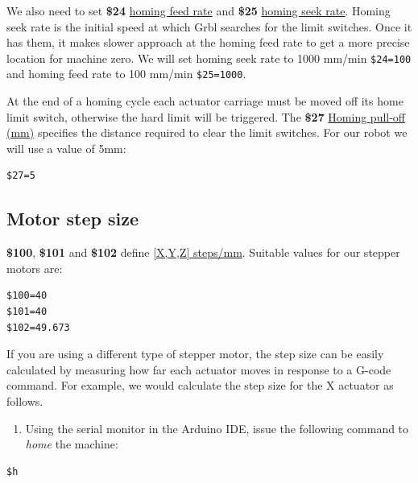 \documentclass[
]{book}
\providecommand{\tightlist}{%
  \setlength{\itemsep}{0pt}\setlength{\parskip}{0pt}}
\begin{document}
We also need to set \textbf{\$24} \href{https://github.com/gnea/grbl/wiki/Grbl-v1.1-Configuration\#24---homing-feed-mmmin}{homing feed rate} and \textbf{\$25} \href{https://github.com/gnea/grbl/wiki/Grbl-v1.1-Configuration\#25---homing-seek-mmmin}{homing seek rate}. Homing seek rate is the initial speed at which Grbl searches for the limit switches. Once it has them, it makes slower approach at the homing feed rate to get a more precise location for machine zero. We will set homing seek rate to 1000 mm/min \texttt{\$24=100} and homing feed rate to 100 mm/min \texttt{\$25=1000}.

At the end of a homing cycle each actuator carriage must be moved off its home limit switch, otherwise the hard limit will be triggered.
The \textbf{\$27} \href{https://github.com/gnea/grbl/wiki/Grbl-v1.1-Configuration\#27---homing-pull-off-mm}{Homing pull-off (mm)} specifies the distance required to clear the limit switches. For our robot we will use a value of 5mm:

\begin{verbatim}
$27=5
\end{verbatim}

\hypertarget{motor-step-size}{%
\subsection{Motor step size}\label{motor-step-size}}

\textbf{\$100}, \textbf{\$101} and \textbf{\$102} define \href{https://github.com/gnea/grbl/wiki/Grbl-v1.1-Configuration\#100-101-and-102--xyz-stepsmm}{{[}X,Y,Z{]} steps/mm}.
Suitable values for our stepper motors are:

\begin{verbatim}
$100=40
$101=40
$102=49.673
\end{verbatim}

If you are using a different type of stepper motor, the step size can be easily calculated by measuring how far each actuator moves in response to a G-code command. For example, we would calculate the step size for the X actuator as follows.

\begin{enumerate}
\def\labelenumi{\arabic{enumi}.}
\tightlist
\item
  Using the serial monitor in the Arduino IDE, issue the following command to \emph{home} the machine:
\end{enumerate}

\begin{verbatim}
$h
\end{verbatim}
\end{document}
